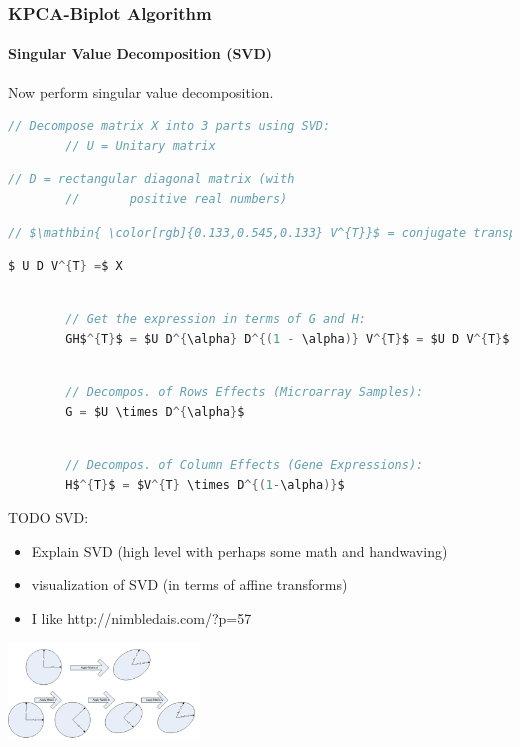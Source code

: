 \documentclass[serif]{beamer}
\newcommand{\codepause}{\pause \vspace{-0.165in} }
\begin{document}
	\begin{frame}[fragile,t]
		\frametitle{KPCA-Biplot Algorithm}
		\framesubtitle{Singular Value Decomposition \textbf{(SVD)}}
		Now perform singular value decomposition. \newline
		
		
		\begin{lstlisting}[mathescape, language=C]
		// Decompose matrix X into 3 parts using SVD:
		// U = Unitary matrix
		\end{lstlisting}
		\codepause
		\begin{lstlisting}[mathescape, language=C]
		// D = rectangular diagonal matrix (with
		//       positive real numbers)
		\end{lstlisting}
		\codepause 
		\begin{lstlisting}[mathescape, language=C]
		// $\mathbin{ \color[rgb]{0.133,0.545,0.133} V^{T}}$ = conjugate transpose of V (a unitary matrix)
		\end{lstlisting}
		\codepause
		\begin{lstlisting}[mathescape, language=C]
		$ U D V^{T} =$ X
		\end{lstlisting}
		\codepause
		\begin{lstlisting}[mathescape, language=C]
		
		// Get the expression in terms of G and H:
		GH$^{T}$ = $U D^{\alpha} D^{(1 - \alpha)} V^{T}$ = $U D V^{T}$ = X 
		\end{lstlisting}
		\codepause
		\begin{lstlisting}[mathescape, language=C]
		
		// Decompos. of Rows Effects (Microarray Samples):
		G = $U \times D^{\alpha}$ 	
		\end{lstlisting}
		\codepause
		\begin{lstlisting}[mathescape, language=C]
		
		// Decompos. of Column Effects (Gene Expressions):
		H$^{T}$ = $V^{T} \times D^{(1-\alpha)}$	
		\end{lstlisting}
	\end{frame}

	\begin{frame}
		\begin{block}{TODO SVD:}
			\begin{itemize}
				\item  Explain SVD (high level with perhaps some math and handwaving)
				\item  visualization of SVD (in terms of affine transforms)
				\item  I like http://nimbledais.com/?p=57
			\end{itemize}
		\end{block}
		\begin{center}
			\includegraphics[width=2in]{images/svd_intuitive}	
		\end{center}
		
	\end{frame}
	
\end{document}
